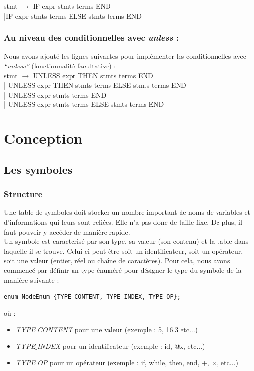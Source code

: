 \documentclass{article}
\begin{document}
\noindent stmt $\rightarrow$ IF expr stmts terms END \\
|IF expr stmts terms ELSE stmts terms END \\ 

\subsubsection*{Au niveau des conditionnelles avec \emph{unless} :}
\noindent Nous avons ajouté les lignes suivantes pour implémenter les conditionnelles avec \emph{``unless''} (fonctionnalité facultative) : \\

\noindent stmt $\rightarrow$ UNLESS expr THEN stmts terms END \\ 
| UNLESS expr THEN stmts terms ELSE stmts terms END \\
| UNLESS expr stmts terms END \\
| UNLESS expr stmts terms ELSE stmts terms END \\ 
\newpage

\section{Conception}

\subsection{Les symboles} 


\subsubsection*{Structure}
Une table de symboles doit stocker un nombre important de noms de variables et d'informations qui leurs sont reliées. Elle n'a pas donc de taille fixe. De plus, il faut pouvoir y accéder de manière rapide.\\
 
Un symbole est caractérisé par son type, sa valeur (son contenu) et la table dans laquelle il se trouve. Celui-ci peut être soit un identificateur, soit un opérateur, soit une valeur (entier, réel ou chaîne de caractères). Pour cela, nous avons commencé par définir un type énuméré pour désigner le type du symbole de la manière suivante : 
\begin{verbatim} 
enum NodeEnum {TYPE_CONTENT, TYPE_INDEX, TYPE_OP}; 
\end{verbatim}
où : 
\begin{itemize}
\item \emph{TYPE$\_$CONTENT} pour une valeur (exemple : 5, 16.3 etc...) \\
\item \emph{TYPE$\_$INDEX} pour un identificateur (exemple : id, @x, etc...) \\
\item \emph{TYPE$\_$OP} pour un opérateur (exemple : if, while, then, end, +, $\times$, etc...) \\
\end{itemize}
\end{document}
